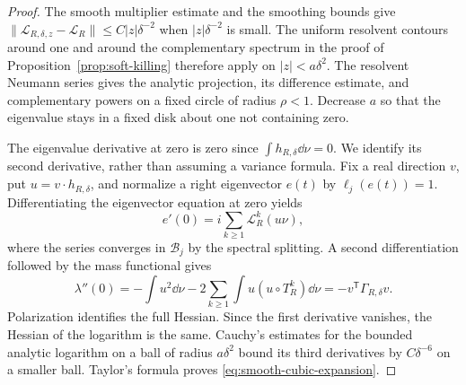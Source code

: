 \begin{proof}
The smooth multiplier estimate and the smoothing bounds give
$\|\mathcal L_{R,\delta,z}-\mathcal L_R\|
\le C|z|\delta^{-2}$ when $|z|\delta^{-2}$ is small.
The uniform resolvent contours around one and around the complementary
spectrum in the proof of Proposition~\ref{prop:soft-killing} therefore
apply on $|z|<a\delta^2$. The resolvent Neumann series gives the analytic
projection, its difference estimate, and complementary powers on a
fixed circle of radius $\rho<1$. Decrease $a$ so that the eigenvalue
stays in a fixed disk about one not containing zero.

The eigenvalue derivative at zero is zero since $\int h_{R,\delta}
\dd\nu=0$. We identify its second derivative, rather than assuming a
variance formula. Fix a real direction $v$, put $u=v\cdot h_{R,\delta}$,
and normalize a right eigenvector $e(t)$ by $\ell_j(e(t))=1$.
Differentiating the eigenvector equation at zero yields
\[
 e'(0)=i\sum_{k\ge1}\mathcal L_R^k(u\nu),
\]
where the series converges in $\mathcal B_j$ by the spectral splitting.
A second differentiation followed by the mass functional gives
\[
 \lambda''(0)=-\int u^2\dd\nu
       -2\sum_{k\ge1}\int u(u\circ T_R^k)\dd\nu
       =-v^{\mathsf T}\Gamma_{R,\delta}v.
\]
Polarization identifies the full Hessian. Since the first derivative
vanishes, the Hessian of the logarithm is the same. Cauchy's estimates
for the bounded analytic logarithm on a ball of radius $a\delta^2$
bound its third derivatives by $C\delta^{-6}$ on a smaller ball.
Taylor's formula proves \eqref{eq:smooth-cubic-expansion}.
\end{proof}

